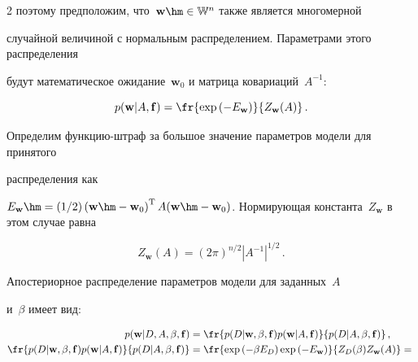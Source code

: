\begin{multicols}{2}
поэтому предположим, что~$\mathbf{w} \hm\in \mathbb{W}^n$ также является многомерной 

случайной величиной с нормальным распределением. Параметрами этого распределения 

будут математическое ожидание~$\mathbf{w}_0$ и матрица ковариаций~$A^{-1}$:

\begin{equation}

\label {eq: exp(-Ew)}

p(\mathbf{w}|A,\mathbf{f})=\fr{\exp\left(-E_{\mathbf{w}}\right)}{Z_{\mathbf{w}}(A)}\,.

\end{equation}



Определим функцию-штраф за большое значение параметров модели для принятого 

распределения как 

$E_\mathbf{w}\hm=({1}/{2})\left(\mathbf{w} \hm- \mathbf{w}_0\right)^{\mathrm{T}}A(\mathbf{w} 

\hm- \mathbf{w}_0)$. Нормирующая константа~$Z_\mathbf{w}$ в этом случае равна

\begin{equation}

\label {eq: Zw}

Z_\mathbf{w}(A)=(2\pi)^{{n}/{2}}|A^{-1}|^{{1}/{2}}\,.

\end{equation}

Апостериорное распределение параметров модели для заданных~$A$

и~$\beta$ имеет вид:

\begin{align}

\label {eq: 4p}

p(\mathbf{w}|D,A,\beta,\mathbf{f})&=

\fr{p(D|\mathbf{w},\beta,\mathbf{f})p(\mathbf{w}|A,\mathbf{f})}{p(D|A,\beta,\mathbf{f})}\,,

\\


\fr{p(D|\mathbf{w},\beta,\mathbf{f})p(\mathbf{w}|A,\mathbf{f})}

{p(D|A,\beta,\mathbf{f})}&=\fr{\exp\left(-\beta E_D\right)

\exp\left(-E_\mathbf{w}\right)}{Z_{D}

(\beta)Z_{\mathbf{w}}(A)}={}\notag\\


\end{align}
\end{multicols}
